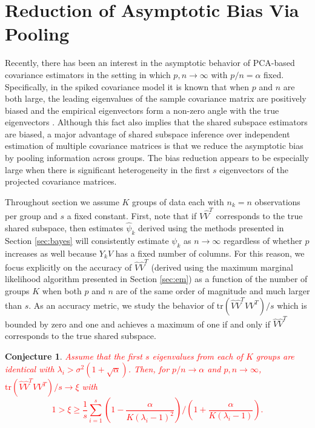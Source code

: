 \documentclass{statsoc}
\newcommand{\tr}{\text{tr}}
\newtheorem{conjecture}{Conjecture}
\newcommand{\edits}[1]{{\textsf{\textcolor{red}{#1}}}}
\newcommand{\edits}[1]{#1}
\begin{document}
\section{Reduction of Asymptotic Bias Via Pooling}
\label{sec:asymp}
Recently, there has been an interest in the asymptotic behavior of
PCA-based covariance estimators in the setting in which
$p, n \to \infty$ with $p/n=\alpha$ fixed.  Specifically, in the
spiked covariance model it is known that when $p$ and $n$ are both
large, the leading eigenvalues of the sample covariance matrix are
positively biased and the empirical eigenvectors form a non-zero angle
with the true eigenvectors \citep{Baik2006, Paul2007}.  Although this
fact also implies that the shared subspace estimators are biased, a
major advantage of shared subspace inference over independent
estimation of multiple covariance matrices is that we reduce the
asymptotic bias by pooling information across groups.  The bias
reduction appears to be especially large when there is significant heterogeneity
in the first $s$ eigenvectors of the projected covariance matrices.

Throughout section we assume $K$ groups of data each with $n_k = n$
observations per group and $s$ a fixed constant.  First, note that if
$\hat{V}\hat{V}^T$ corresponds to the true shared subspace, then
estimates $\hat{\psi}_k$ derived using the methods presented in
Section \ref{sec:bayes} will consistently estimate $\psi_k$ as
$n \to \infty$ regardless of whether $p$ increases as well because
$Y_kV$ has a fixed number of columns.  For this reason, we focus
explicitly on the accuracy of $\hat{V}\hat{V}^T$ (derived using the
maximum marginal likelihood algorithm presented in Section
\ref{sec:em}) as a function of the number of groups $K$ when both $p$
and $n$ are of the same order of magnitude and much larger than $s$.
As an accuracy metric, we study the behavior of
$\tr(\hat{V}\hat{V}^TVV^T)/s$ which is bounded by zero and one
and achieves a maximum of one if and only if $\hat{V}\hat{V}^T$
corresponds to the true shared subspace.

\begin{conjecture}
\edits{Assume that the first $s$ eigenvalues from each of $K$ groups are
  identical with $\lambda_i > \sigma^2(1 + \sqrt{\alpha})$.  Then,
 for $p/n \to \alpha$ and $p, n
  \to \infty$,  $\tr(\hat{V}\hat{V}^TVV^T)/s \to \xi$ with  
\begin{equation}1 > \xi \geq  \frac{1}{s}\sum_{i=1}^s  \left(1-\frac{\alpha}{K(\lambda_i - 1)^2}\right) /\left(1 +
    \frac{\alpha}{K(\lambda_i - 1)}\right).
\label{eqn:asympBound}
\end{equation}  }
\end{conjecture}
\end{document}
